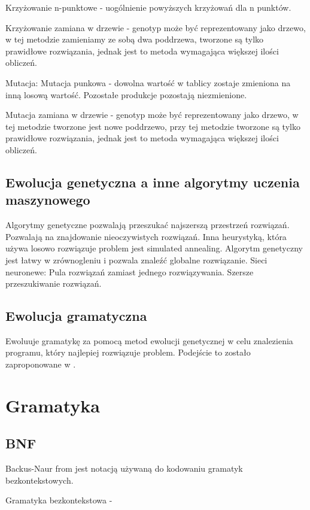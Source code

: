 Krzyżowanie n-punktowe - uogólnienie powyższych krzyżowań dla n punktów.

Krzyżowanie zamiana w drzewie - genotyp może być reprezentowany jako drzewo, w tej metodzie zamieniamy ze sobą dwa poddrzewa, tworzone są tylko prawidłowe rozwiązania, jednak jest to metoda wymagająca większej ilości obliczeń. 


Mutacja:
Mutacja punkowa - dowolna wartość w tablicy zostaje zmieniona na inną losową wartość. Pozostałe produkcje pozostają niezmienione.

Mutacja zamiana w drzewie - genotyp może być reprezentowany jako drzewo, w tej metodzie tworzone jest nowe poddrzewo, przy tej metodzie tworzone są tylko prawidłowe rozwiązania, jednak jest to metoda wymagająca większej ilości obliczeń. 

 
  
\subsection{Ewolucja genetyczna a inne algorytmy uczenia maszynowego}
Algorytmy genetyczne pozwalają przeszukać najszerszą przestrzeń rozwiązań. Pozwalają na znajdowanie nieoczywistych rozwiązań.  
Inna heurystyką, która używa losowo rozwiązuje problem jest simulated annealing. Algorytm genetyczny jest łatwy w zrównogleniu i pozwala znaleźć globalne rozwiązanie.
Sieci neuronewe:
Pula rozwiązań zamiast jednego rozwiązywania. Szersze przeszukiwanie rozwiązań. 
\subsection{Ewolucja gramatyczna}
Ewoluuje gramatykę za pomocą metod ewolucji genetycznej w celu znalezienia programu, który najlepiej rozwiązuje problem.
Podejście to zostało zaproponowane w \cite{ryan_collins_neill_1998}. 


\section{Gramatyka}
\label{sec:gramatyka}
\subsection{BNF}
Backus-Naur from jest notacją używaną do kodowaniu gramatyk bezkontekstowych.

Gramatyka bezkontekstowa - 

